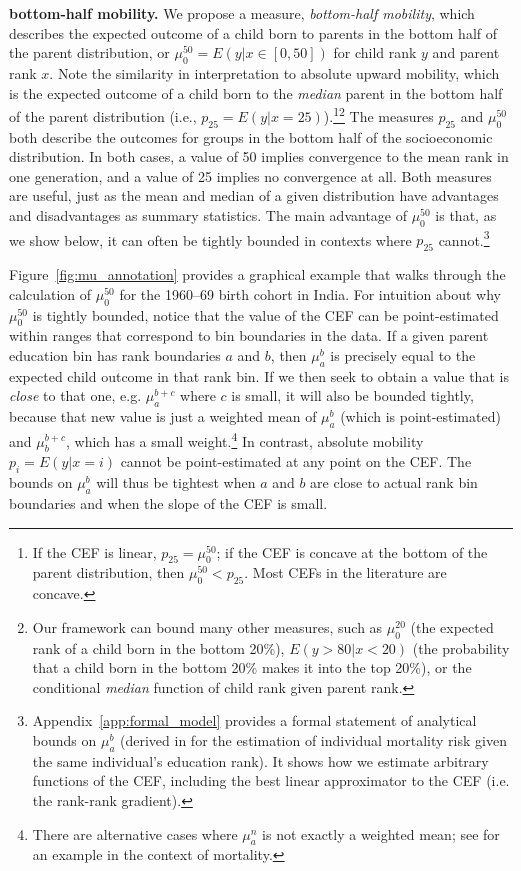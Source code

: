 \documentclass[12pt,letterpaper]{article}
\numberwithin{equation}{section}
\begin{document}
\textbf{bottom-half mobility.} We propose a measure, \textit{bottom-half mobility}, which describes the expected outcome of a child born to parents in the bottom half of the parent distribution, or $\mu_0^{50} = E(y|x \in [0, 50])$ for child rank $y$ and parent rank $x$. Note the similarity in interpretation to absolute upward mobility, which is the expected outcome of a child born to the \textit{median} parent in the bottom half of the parent distribution (i.e., $p_{25}=E(y|x = 25)$).\footnote{If the CEF is linear, $p_{25}=\mu_0^{50}$; if the CEF is concave at the bottom of the parent distribution, then $\mu_0^{50} < p_{25}$. Most CEFs in the literature are concave.}\superscript{,}\footnote{Our framework can bound many other measures, such as $\mu_0^{20}$ (the expected rank of a child born in the bottom 20\%), $E(y > 80 | x < 20)$ (the probability that a child born in the bottom 20\% makes it into the top 20\%), or the conditional \textit{median} function of child rank given parent rank.} The measures $p_{25}$ and $\mu_0^{50}$ both describe the outcomes for groups in the bottom half of the socioeconomic distribution. In both cases, a value of 50 implies convergence to the mean rank in one generation, and a value of 25 implies no convergence at all. Both measures are useful, just as the mean and median of a given distribution have advantages and disadvantages as summary statistics. The main advantage of $\mu_0^{50}$ is that, as we show below, it can often be tightly bounded in contexts where $p_{25}$ cannot.\footnote{Appendix~\ref{app:formal_model} provides a formal statement of analytical bounds on $\mu_a^b$ (derived in  for the estimation of individual mortality risk given the same individual's education rank). It shows how we estimate arbitrary functions of the CEF, including the best linear approximator to the CEF (i.e. the rank-rank gradient).} 

Figure~\ref{fig:mu_annotation} provides a graphical example that walks through the calculation of $\mu_0^{50}$ for the 1960--69 birth cohort in India. For intuition about why $\mu_0^{50}$ is tightly bounded, notice that the value of the CEF can be point-estimated within ranges that correspond to bin boundaries in the data. If a given parent education bin has rank boundaries $a$ and $b$, then $\mu_a^b$ is precisely equal to the expected child outcome in that rank bin. If we then seek to obtain a value that is \textit{close} to that one, e.g. $\mu_a^{b+c}$ where $c$ is small, it will also be bounded tightly, because that new value is just a weighted mean of $\mu_a^b$ (which is point-estimated) and $\mu_b^{b+c}$, which has a small weight.\footnote{There are alternative cases where $\mu_a^n$ is not exactly a weighted mean; see  for an example in the context of mortality.} In contrast, absolute mobility $p_i = E(y|x=i)$ cannot be point-estimated at any point on the CEF. The bounds on $\mu_a^b$ will thus be tightest when $a$ and $b$ are close to actual rank bin boundaries and when the slope of the CEF is small. 
\end{document}
